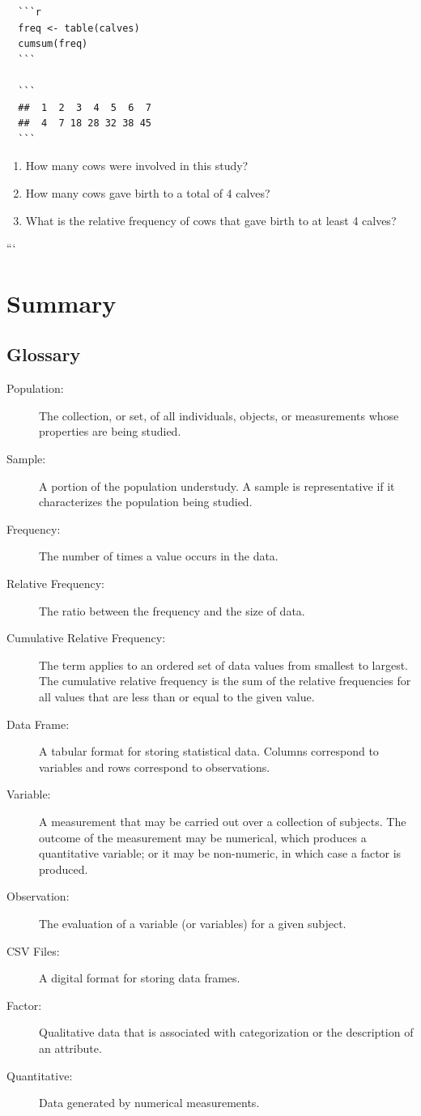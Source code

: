 \documentclass[]{krantz}
\theoremstyle{definition}
\theoremstyle{definition}
\theoremstyle{definition}
\theoremstyle{remark}
\begin{document}
\begin{verbatim}
  ```r
  freq <- table(calves)
  cumsum(freq)
  ```
  
  ```
  ##  1  2  3  4  5  6  7 
  ##  4  7 18 28 32 38 45
  ```
\end{verbatim}

\begin{enumerate}
\def\labelenumi{\arabic{enumi}.}
\item
  How many cows were involved in this study?
\item
  How many cows gave birth to a total of 4 calves?
\item
  What is the relative frequency of cows that gave birth to at least 4
  calves?
\end{enumerate}

```

\section{Summary}\label{summary-1}

\subsection*{Glossary}\label{glossary}


\begin{description}
\item[Population:]
The collection, or set, of all individuals, objects, or measurements
whose properties are being studied.
\item[Sample:]
A portion of the population understudy. A sample is representative if it
characterizes the population being studied.
\item[Frequency:]
The number of times a value occurs in the data.
\item[Relative Frequency:]
The ratio between the frequency and the size of data.
\item[Cumulative Relative Frequency:]
The term applies to an ordered set of data values from smallest to
largest. The cumulative relative frequency is the sum of the relative
frequencies for all values that are less than or equal to the given
value.
\item[Data Frame:]
A tabular format for storing statistical data. Columns correspond to
variables and rows correspond to observations.
\item[Variable:]
A measurement that may be carried out over a collection of subjects. The
outcome of the measurement may be numerical, which produces a
quantitative variable; or it may be non-numeric, in which case a factor
is produced.
\item[Observation:]
The evaluation of a variable (or variables) for a given subject.
\item[CSV Files:]
A digital format for storing data frames.
\item[Factor:]
Qualitative data that is associated with categorization or the
description of an attribute.
\item[Quantitative:]
Data generated by numerical measurements.
\end{description}
\end{document}
